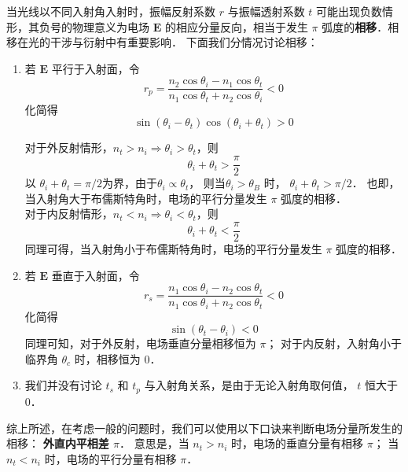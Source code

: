 
\begin{issues}
\issueMissDepend
\end{issues}


当光线以不同入射角入射时，振幅反射系数 $r$ 与振幅透射系数 $t$  可能出现负数情形，其负号的物理意义为电场 $\boldsymbol{E}$ 的相应分量反向，相当于发生 $\pi$ 弧度的\textbf{相移}．相移在光的干涉与衍射中有重要影响．
下面我们分情况讨论相移：
\begin{enumerate}
\item 若 $\boldsymbol{E}$ 平行于入射面，令
$$ r_p =  \dfrac{n_2\cos{\theta_i} - n_1\cos\theta_t}{n_1\cos\theta_t + n_2\cos\theta_i} < 0 $$
化简得
$$ \sin(\theta_i - \theta_t)\cos(\theta_i + \theta_t) > 0$$

对于外反射情形，$n_t > n_i \Rightarrow \theta_i > \theta_t$，则
$$\theta_i + \theta_t > \frac{\pi}{2}$$
以 $\theta_i + \theta_t = \pi/2$为界，由于$\theta_i \propto \theta_t$， 则当$\theta_i > \theta_B$ 时， $\theta_i + \theta_t > \pi/2$． 也即，当入射角大于布儒斯特角时，电场的平行分量发生 $\pi$ 弧度的相移．\\

对于内反射情形，$ n_t < n_i \Rightarrow \theta_i < \theta_t$，则
$$\theta_i + \theta_t < \frac{\pi}{2}$$
同理可得，当入射角小于布儒斯特角时，电场的平行分量发生 $\pi$ 弧度的相移．

\item 若 $\boldsymbol{E}$ 垂直于入射面，令
$$r_s  = \frac{n_1\cos{\theta_i} - n_2\cos\theta_t}{n_1\cos\theta_i + n_2\cos\theta_t} < 0$$
化简得
$$\sin(\theta_t - \theta_i) < 0$$
同理可知，对于外反射，电场垂直分量相移恒为 $\pi$； 对于内反射，入射角小于临界角 $\theta_c$ 时，相移恒为 0．\\

\item 我们并没有讨论 $t_s$ 和 $t_p$ 与入射角关系，是由于无论入射角取何值， $ t$ 恒大于0．
\end{enumerate}
综上所述，在考虑一般的问题时，我们可以使用以下口诀来判断电场分量所发生的相移： 
\textbf{外直内平相差 $\pi$}．
意思是，当 $n_t > n_i$ 时，电场的垂直分量有相移 $\pi$； 当 $n_t < n_i$ 时，电场的平行分量有相移 $\pi$．


